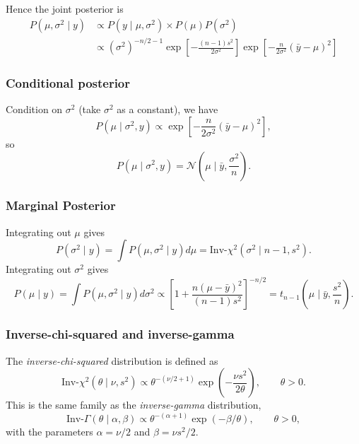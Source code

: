 \documentclass[11pt, titlepage]{article} %
\numberwithin{equation}{section}
\theoremstyle{definition}
\numberwithin{assumption}{section}
\begin{document}
Hence the joint posterior is
\begin{align*}
    P(\mu,\sigma^2\mid y)
    &\propto P(y\mid \mu, \sigma^2)\times P(\mu)P(\sigma^2)
   \\
    &\propto (\sigma^2)^{-n/2-1}
    \exp\!\left[
    -\frac{(n-1)s^2}{2\sigma^2}
    \right]
    \exp\!\left[
    -\frac{n}{2\sigma^2}(\bar y-\mu)^2
    \right]
\end{align*}

\subsubsection*{Conditional posterior}

Condition on $\sigma^2$ (take $\sigma^2$ as a constant), we have
\begin{equation*}
    P(\mu\mid \sigma^2,y)
    \propto 
    \exp\!\left[
    -\frac{n}{2\sigma^2}(\bar y-\mu)^2
    \right],
\end{equation*}
so
\begin{equation*}
    P(\mu\mid \sigma^2,y)= \mathcal{N}\!\left(\mu\mid \bar y,\frac{\sigma^2}{n}\right).
\end{equation*}

\subsubsection*{Marginal Posterior}
Integrating out $\mu$ gives
\begin{equation*}
    P(\sigma^2\mid y)=\int  P(\mu,\sigma^2\mid y) d\mu
    =\mathrm{Inv}\text{-}\chi^2(\sigma^2\mid n-1,s^2).
\end{equation*}
Integrating out $\sigma^2$ gives
\begin{equation*}
    P(\mu\mid y)=\int  P(\mu,\sigma^2\mid y) d\sigma^2
    \propto
    \left[
    1+\frac{n(\mu-\bar y)^2}{(n-1)s^2}
    \right]^{-n/2}
    =
    t_{n-1}\!\left(\mu\mid \bar y,\frac{s^2}{n}\right).
\end{equation*}

\subsubsection*{Inverse-chi-squared and inverse-gamma}

The \textit{inverse-chi-squared} distribution is defined as
\begin{equation*}
    \mathrm{Inv}\text{-}\chi^2(\theta\mid \nu,s^2)
    \propto
    \theta^{-(\nu/2+1)}
    \exp\!\left(-\frac{\nu s^2}{2\theta}\right),
    \qquad \theta>0.
\end{equation*}
This is the same family as the \textit{inverse-gamma} distribution,
\begin{equation*}
    \mathrm{Inv}\text{-}\Gamma(\theta\mid \alpha,\beta)
    \propto
    \theta^{-(\alpha+1)}
    \exp(-\beta/\theta),
    \qquad \theta>0,
\end{equation*}
with the parameters $\alpha=\nu/2$ and $\beta=\nu s^2/2$.
\end{document}

